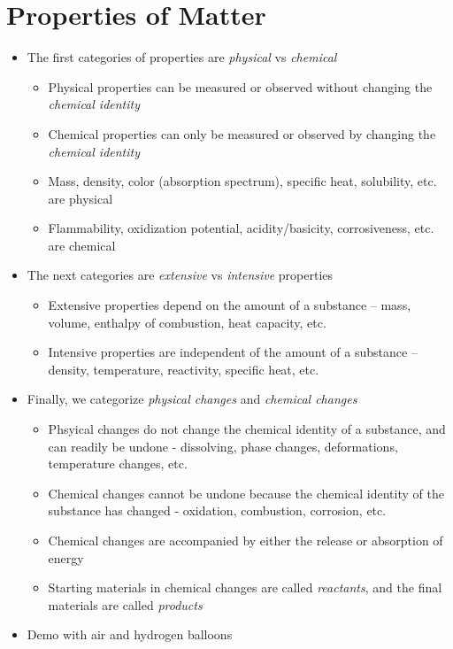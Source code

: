 \documentclass[12pt, openany, letterpaper]{memoir}
\begin{document}
\section{Properties of Matter}
\begin{itemize}
	\item The first categories of properties are \emph{physical} vs \emph{chemical}
	      \begin{itemize}
		      \item Physical properties can be measured or observed without changing the \emph{chemical identity}
		      \item Chemical properties can only be measured or observed by changing the \emph{chemical identity}
		      \item Mass, density, color (absorption spectrum), specific heat, solubility, etc. are physical
		      \item Flammability, oxidization potential, acidity/basicity, corrosiveness, etc. are chemical
	      \end{itemize}
	\item The next categories are \emph{extensive} vs \emph{intensive} properties
	      \begin{itemize}
		      \item Extensive properties depend on the amount of a substance -- mass, volume, enthalpy of combustion, heat capacity, etc.
		      \item Intensive properties are independent of the amount of a substance -- density, temperature, reactivity, specific heat, etc.
	      \end{itemize}
	\item Finally, we categorize \emph{physical changes} and \emph{chemical changes}
	      \begin{itemize}
		      \item Phsyical changes do not change the chemical identity of a substance, and can readily be undone - dissolving, phase changes, deformations, temperature changes, etc.
		      \item Chemical changes cannot be undone because the chemical identity of the substance has changed - oxidation, combustion, corrosion, etc.
		      \item Chemical changes are accompanied by either the release or absorption of energy
		      \item Starting materials in chemical changes are called \emph{reactants}, and the final materials are called \emph{products}
	      \end{itemize}
	\item Demo with air and hydrogen balloons
\end{itemize}
\end{document}
